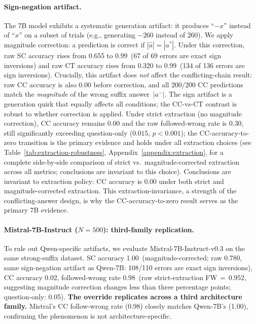 \documentclass{article}
\theoremstyle{definition}
\theoremstyle{definition}
\newcommand{\SBSCACC}{0.99}
\newcommand{\SBCCFW}{1.00}
\newcommand{\SBCTACC}{0.99}
\newcommand{\SBN}{200}
\newcommand{\MISTSCACC}{1.00}
\newcommand{\MISTCCACC}{0.02}
\newcommand{\MISTCCFW}{0.98}
\newcommand{\MISTQOACC}{0.05}
\newcommand{\MISTN}{500}
\begin{document}
\paragraph{Sign-negation artifact.}
The 7B model exhibits a systematic generation artifact: it produces
``$-x$'' instead of ``$x$'' on a subset of trials (e.g., generating
$-260$ instead of $260$). We apply magnitude correction: a prediction
is correct if $|\hat{a}| = |a^*|$.
Under this correction, raw SC accuracy rises from 0.655 to
\SBSCACC\ (67 of 69 errors are exact sign inversions) and raw CT
accuracy rises from 0.320 to \SBCTACC\ (134 of 136 errors are sign
inversions).
Crucially, this artifact does \emph{not} affect the conflicting-chain
result: raw CC accuracy is also 0.00 before correction, and all
$\SBN/\SBN$ CC predictions match the \emph{magnitude} of the wrong
suffix answer~$|a^-|$. The sign artifact is a generation quirk that
equally affects all conditions; the CC-vs-CT contrast is robust to
whether correction is applied. Under strict extraction (no magnitude
correction), CC accuracy remains 0.00 and the raw followed-wrong rate
is $0.30$, still significantly exceeding question-only ($0.015$,
$p < 0.001$); the CC-accuracy-to-zero transition is the primary
evidence and holds under all extraction choices
(see Table~\ref{tab:extraction-robustness}, Appendix~\ref{appendix:extraction},
for a complete side-by-side comparison of strict vs.\ magnitude-corrected
extraction across all metrics; conclusions are invariant to this choice).
Conclusions are invariant to extraction policy:
CC accuracy is 0.00 under both strict and magnitude-corrected extraction.
This extraction-invariance, a strength of the conflicting-answer design, is
why the CC-accuracy-to-zero result serves as the primary 7B evidence.

\paragraph{Mistral-7B-Instruct ($N{=}\MISTN$): third-family replication.}
To rule out Qwen-specific artifacts, we evaluate Mistral-7B-Instruct-v0.3
on the same strong-suffix dataset.
SC accuracy \MISTSCACC\ (magnitude-corrected; raw 0.780, same sign-negation
artifact as Qwen-7B: 108/110 errors are exact sign inversions),
CC accuracy \MISTCCACC, followed-wrong rate \MISTCCFW\
(raw strict-extraction FW$\,{=}\,0.952$, suggesting magnitude correction
changes less than three percentage points; question-only: \MISTQOACC).
\textbf{The override replicates across a third architecture family.}
Mistral's CC follow-wrong rate (\MISTCCFW) closely matches Qwen-7B's
(\SBCCFW), confirming the phenomenon is not architecture-specific.
\end{document}
